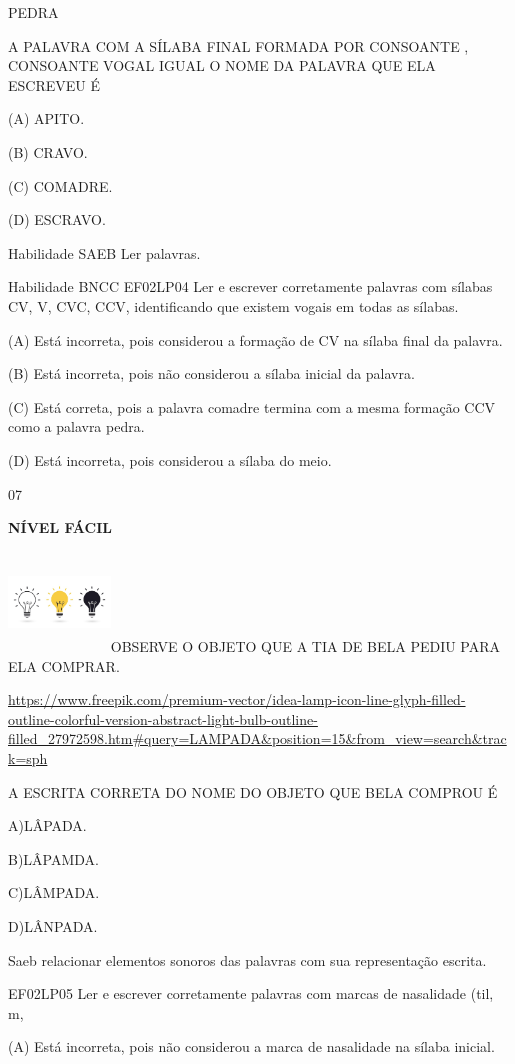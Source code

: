 {{PEDRA

A PALAVRA COM A SÍLABA FINAL FORMADA POR CONSOANTE , CONSOANTE VOGAL
IGUAL O NOME DA PALAVRA QUE ELA ESCREVEU É

(A) APITO.

(B) CRAVO.

(C) COMADRE.

(D) ESCRAVO.

Habilidade SAEB Ler palavras.

Habilidade BNCC EF02LP04 Ler e escrever corretamente palavras com
sílabas CV, V, CVC, CCV, identificando que existem vogais em todas as
sílabas.

(A) Está incorreta, pois considerou a formação de CV na sílaba final da
palavra.

(B) Está incorreta, pois não considerou a sílaba inicial da palavra.

(C) Está correta, pois a palavra comadre termina com a mesma formação
CCV como a palavra pedra.

(D) Está incorreta, pois considerou a sílaba do meio.

\num{07}

\textbf{NÍVEL FÁCIL}

\includegraphics[width=1.07025in,height=1.04487in]{media/image178.jpeg}OBSERVE
O OBJETO QUE A TIA DE BELA PEDIU PARA ELA COMPRAR.

\url{https://www.freepik.com/premium-vector/idea-lamp-icon-line-glyph-filled-outline-colorful-version-abstract-light-bulb-outline-filled_27972598.htm\#query=LAMPADA\&position=15\&from_view=search\&track=sph}

A ESCRITA CORRETA DO NOME DO OBJETO QUE BELA COMPROU É

A)LÂPADA.

B)LÂPAMDA.

C)LÂMPADA.

D)LÂNPADA.

Saeb relacionar elementos sonoros das palavras com sua representação
escrita.

EF02LP05 Ler e escrever corretamente palavras com marcas de nasalidade
(til, m,

(A) Está incorreta, pois não considerou a marca de nasalidade na sílaba
inicial.

}}
